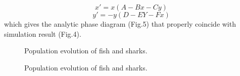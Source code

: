 \documentclass[aps,prl,preprint,superscriptaddress]{revtex4}
\begin{document}
\begin{equation}
x' = x(A - Bx - Cy)
\end{equation}
\begin{equation}
y' = -y(D - EY -Fx)
\end{equation}
which gives the analytic phase diagram (Fig.5) that properly coincide with simulation result (Fig.4).

\begin{figure}[H]
	\centering
	\caption{Population evolution of fish and sharks.}
	\label{more_clusters} 
\end{figure}


\begin{figure}[H]
	\centering
	\caption{Population evolution of fish and sharks.}
	\label{more_clusters} 
\end{figure}
\end{document}
